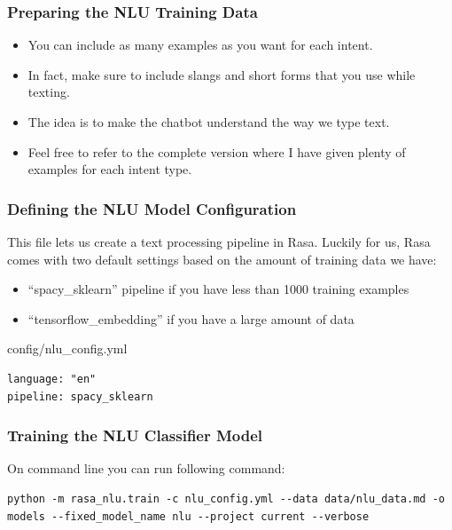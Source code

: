  \begin{frame}[fragile]\frametitle{Preparing the NLU Training Data}

\begin{itemize}
\item You can include as many examples as you want for each intent. 
\item In fact, make sure to include slangs and short forms that you use while texting. 
\item The idea is to make the chatbot understand the way we type text. 
\item Feel free to refer to the complete version where I have given plenty of examples for each intent type.
\end{itemize}

\end{frame}

 \begin{frame}[fragile]\frametitle{Defining the NLU Model Configuration}
This file lets us create a text processing pipeline in Rasa. Luckily for us, Rasa comes with two default settings based on the amount of training data we have:

\begin{itemize}
\item ``spacy\_sklearn'' pipeline if you have less than 1000 training examples
\item ``tensorflow\_embedding'' if you have a large amount of data
\end{itemize}

config/nlu\_config.yml
 
\begin{lstlisting}
language: "en"
pipeline: spacy_sklearn
\end{lstlisting}

\end{frame}

 \begin{frame}[fragile]\frametitle{Training the NLU Classifier Model}
On command line you can run following command:

\begin{lstlisting}
python -m rasa_nlu.train -c nlu_config.yml --data data/nlu_data.md -o models --fixed_model_name nlu --project current --verbose
\end{lstlisting}

\end{frame}

